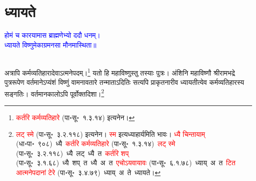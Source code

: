 \section[ध्यायते]{ध्यायते}
\centering\textcolor{blue}{होमं च कारयामास ब्राह्मणेभ्यो ददौ धनम्।\nopagebreak\\
ध्यायते विष्णुमेकाग्रमनसा मौनमास्थिता॥}\nopagebreak\\
\\
\fontsize{14}{21}\selectfont\begin{sloppypar}\justifying\noindent\hspace{10mm} अत्रापि कर्म\-व्यतिहारादेवाऽत्मने\-पदम्।\footnote{\textcolor{red}{कर्तरि कर्मव्यतिहारे} (पा॰सू॰~१.३.१४) इत्यनेन।} यतो हि महाविष्णुस्तु तस्याः पुत्रः। अंशिनि महाविष्णौ श्रीरामभद्रे पुत्र\-रूपेण वर्तमानेऽप्यंशं विष्णुं वामनावतारे तन्माताऽदितिः सत्यपि प्राकृत\-नारीव ध्यायतीत्येव कर्म\-व्यतिहारस्य सङ्गतिः। वर्तमान\-कालोऽपि पूर्वोक्त\-दिशा।\footnote{\textcolor{red}{लट् स्मे} (पा॰सू॰~३.२.११८) इत्यनेन। \textcolor{red}{स्म} इत्यध्याहार्यमिति भावः। \textcolor{red}{ध्यै चिन्तायाम्} (धा॰पा॰~९०८)~\arrow ध्यै~\arrow \textcolor{red}{कर्तरि कर्मव्यतिहारे} (पा॰सू॰~१.३.१४)~\arrow \textcolor{red}{लट् स्मे} (पा॰सू॰~३.२.११८)~\arrow ध्यै~लट्~\arrow ध्यै~त~\arrow \textcolor{red}{कर्तरि शप्‌} (पा॰सू॰~३.१.६८)~\arrow ध्यै~शप्~त~\arrow ध्यै~अ~त~\arrow \textcolor{red}{एचोऽयवायावः} (पा॰सू॰~६.१.७८)~\arrow ध्याय्~अ~त~\arrow \textcolor{red}{टित आत्मनेपदानां टेरे} (पा॰सू॰~३.४.७९)~\arrow ध्याय्~अ~ते~\arrow ध्यायते।}\end{sloppypar}
